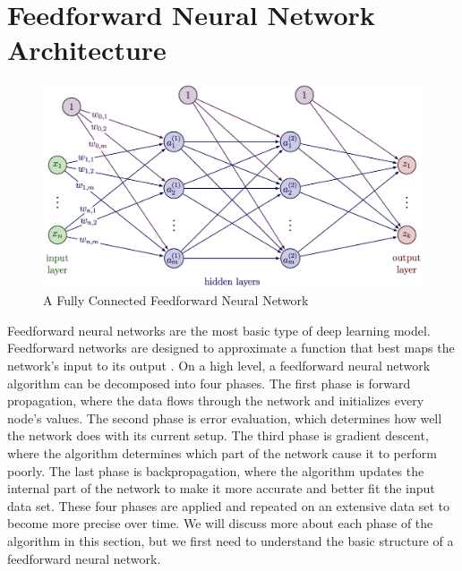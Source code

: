 \section{Feedforward Neural Network Architecture} \label{sec:feedforward_nn}

\begin{figure}[!ht]
    \centering
    \includegraphics[width=5in]{figures/ffn_diagram.png}
    \caption{A Fully Connected Feedforward Neural Network} \label{fig:fc_ffn}
\end{figure}

Feedforward neural networks are the most basic type of deep learning model. Feedforward networks are designed to approximate a function that best maps the network's input to its output \cite{lecun2015deep}. On a high level, a feedforward neural network algorithm can be decomposed into four phases. The first phase is forward propagation, where the data flows through the network and initializes every node's values. The second phase is error evaluation, which determines how well the network does with its current setup. The third phase is gradient descent, where the algorithm determines which part of the network cause it to perform poorly. The last phase is backpropagation, where the algorithm updates the internal part of the network to make it more accurate and better fit the input data set. These four phases are applied and repeated on an extensive data set to become more precise over time. We will discuss more about each phase of the algorithm in this section, but we first need to understand the basic structure of a feedforward neural network.

